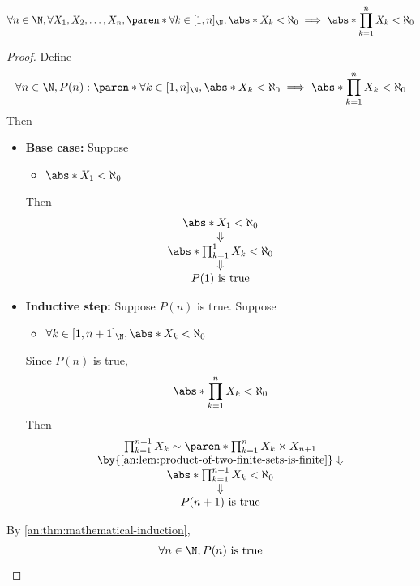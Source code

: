 \bigskip

\begin{theorem} \label{an:thm:product-of-finite-sets-is-finite}
  \[
    \forall n \in \N, \forall X_{1}, X_{2}, \ldots, X_{n},
    \paren*{\forall k \in [1, n]_{\N}, \abs*{X_{k}} < \aleph_{0}}
    \implies \abs*{\prod_{k = 1}^{n} X_{k}} < \aleph_{0}
  \]
\end{theorem}

\begin{proof}
  Define
  \[
    \forall n \in \N, P(n): \paren*{\forall k \in [1, n]_{\N}, \abs*{X_{k}} < \aleph_{0}}
    \implies \abs*{\prod_{k = 1}^{n} X_{k}} < \aleph_{0}
  \]
  Then
  \begin{itemize}
    \item \textbf{Base case:} Suppose
          \begin{itemize}
            \item $\abs*{X_{1}} < \aleph_{0}$
          \end{itemize}
          Then
          \[
            \begin{array}{c}
              \abs*{X_{1}} < \aleph_{0}                   \\
              \Downarrow                                  \\
              \abs*{\prod_{k = 1}^{1} X_{k}} < \aleph_{0} \\
              \Downarrow                                  \\
              P(1) \text{ is true}
            \end{array}
          \]
    \item \textbf{Inductive step:} Suppose $P(n)$ is true. Suppose
          \begin{itemize}
            \item $\forall k \in [1, n + 1]_{\N}, \abs*{X_{k}} < \aleph_{0}$
          \end{itemize}
          Since $P(n)$ is true,
          \[
            \abs*{\prod_{k = 1}^{n} X_{k}} < \aleph_{0}
          \]
          Then
          \[
            \begin{array}{c}
              \prod_{k = 1}^{n + 1} X_{k} \sim \paren*{\prod_{k = 1}^{n} X_{k}} \times X_{n + 1} \\
              \by{\Cref{an:lem:product-of-two-finite-sets-is-finite}} \Downarrow                 \\
              \abs*{\prod_{k = 1}^{n + 1} X_{k}} < \aleph_{0}                                    \\
              \Downarrow                                                                         \\
              P(n + 1) \text{ is true}
            \end{array}
          \]
  \end{itemize}
  By \cref{an:thm:mathematical-induction},
  \[
    \forall n \in \N, P(n) \text{ is true}
  \]
\end{proof}

